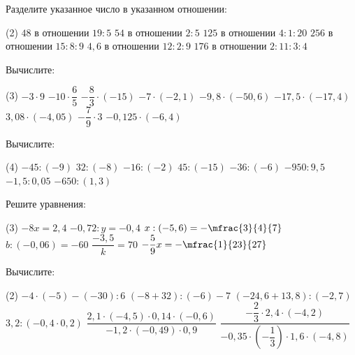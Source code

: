 \begin{class}[number=5]
	\begin{listofex}
		\item Разделите указанное число в указанном отношении:
		\begin{tasks}(2)
			\task \( 48 \) в отношении \( 19:5 \)
			\task \( 54 \) в отношении \( 2:5 \)
			\task \( 125 \) в отношении \( 4:1:20 \)
			\task \( 256 \) в отношении \( 15:8:9 \)
			\task \( 4,6 \) в отношении \( 12:2:9 \)
			\task \( 176 \) в отношении \( 2:11:3:4 \)
		\end{tasks}
		\item Вычислите:
		\begin{tasks}(3)
			\task \( -3 \cdot 9 \)
			\task \( -10 \cdot \dfrac{6}{5} \)
			\task \( -\dfrac{8}{3} \cdot (-15) \)
			\task \( -7 \cdot (-2,1) \)
			\task \( -9,8 \cdot (-50,6) \)
			\task \( -17,5 \cdot (-17,4) \)
			\task \( 3,08 \cdot (-4,05) \)
			\task \( -\dfrac{7}{9}\cdot 3 \)
			\task \( -0,125 \cdot (-6,4) \)
		\end{tasks}
		\item Вычислите:
		\begin{tasks}(4)
			\task \( -45 : (-9) \)
			\task \( 32 : (-8) \)
			\task \( -16 : (-2) \)
			\task \( 45 : (-15) \)
			\task \( -36 : (-6) \)
			\task \( -950 : 9,5 \)
			\task \( -1,5 : 0,05 \)
			\task \( -650 : (1,3) \)
		\end{tasks}
		\item Решите уравнения:
		\begin{tasks}(3)
			\task \( -8x=2,4 \)
			\task \( -0,72:y=-0,4 \)
			\task \( x:(-5,6)=-\mfrac{3}{4}{7} \)
			\task \( b: (-0,06) = -60 \)
			\task \( \dfrac{-3,5}{k}=70 \)
			\task \( -\dfrac{5}{9}x=-\mfrac{1}{23}{27} \)
		\end{tasks}
		\item Вычислите:
		\begin{tasks}(2)
			\task \( -4 \cdot (-5) - (-30):6 \)
			\task \( (-8+32):(-6)-7 \)
			\task \( (-24,6+13,8):(-2,7) \)
			\task \( 3,2:(-0,4 \cdot 0,2)  \)
			\task \( \dfrac{2,1 \cdot (-4,5) \cdot 0,14 \cdot (-0,6)}{-1,2 \cdot (-0,49) \cdot 0,9} \)
			\task \( \dfrac{-\dfrac{2}{3}\cdot2,4\cdot(-4,2)}{ -0,35\cdot \left( -\dfrac{1}{3} \right) \cdot 1,6 \cdot (-4,8) } \)
		\end{tasks}
	\end{listofex}
\end{class}

